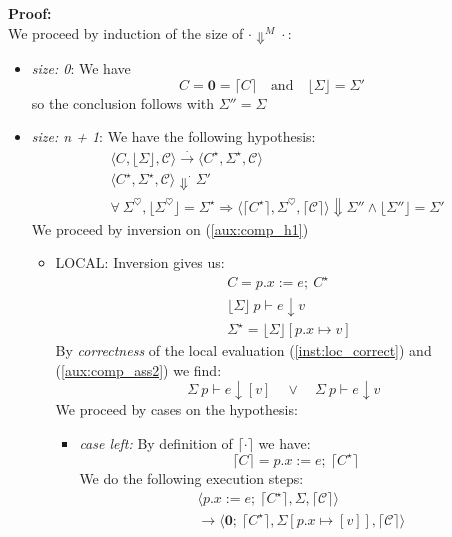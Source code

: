 \documentclass[12pt,a4paper,twoside]{book}
\newcommand{\heart}{\heartsuit}
\begin{document}
\noindent\textbf{Proof:}\\
We proceed by induction of the size of $\cdot \Downarrow^M \cdot$:
\begin{itemize}
\item \emph{size: 0}: We have 
$$ C = \boldsymbol{0} = \lceil C \rceil
\quad \text{and}\quad \lfloor \Sigma \rfloor = \Sigma'$$
so the conclusion follows with $\Sigma'' = \Sigma$
\item \emph{size: n + 1}: We have the following hypothesis:
\begin{align}
&\langle C, \lfloor \Sigma \rfloor, \mathscr{C}\rangle \xrightarrow{.}
\langle C^\star, \Sigma^\star, \mathscr{C}\rangle
\label{aux:comp_h1}\tag{H1}\\
&\langle C^\star, \Sigma^\star, \mathscr{C}\rangle
\Downarrow^\cdot \Sigma'
\label{aux:comp_h2}\tag{H2}\\
&\forall~\Sigma^\heart, \lfloor \Sigma^\heart \rfloor = \Sigma^\star
\Rightarrow \langle \lceil C^\star \rceil, \Sigma^\heart, \lceil \mathscr{C} \rceil\rangle \Downarrow \Sigma'' \land \lfloor \Sigma'' \rfloor = \Sigma'
\label{aux:comp_ih}\tag{IH}
\end{align}
We proceed by inversion on (\ref{aux:comp_h1})
\begin{itemize}
\item LOCAL: Inversion gives us:
\begin{align}
&C = p.x := e;~ C^\star \label{aux:comp_ass1}\tag{I1}\\
&\lfloor \Sigma \rfloor~p \vdash e \downarrow v \label{aux:comp_ass2}\tag{I2}\\
&\Sigma^\star = \lfloor \Sigma \rfloor[p.x \mapsto v]\label{aux:comp_ass3}\tag{I3}
\end{align}
By \emph{correctness} of the local evaluation (\ref{inst:loc_correct}) and (\ref{aux:comp_ass2}) we find:
\begin{equation}\label{aux:comp_ass4}
\Sigma~p \vdash e \downarrow [v] \quad \lor \quad
\Sigma~p \vdash e \downarrow v
\end{equation}
We proceed by cases on the hypothesis:
\begin{itemize}
\item \emph{case left:}
By definition of $\lceil \cdot \rceil$ we have:
$$\lceil C \rceil = p.x := e;~\lceil C^\star \rceil$$
We do the following execution steps:
\begin{align*}
&\langle p.x := e;~\lceil C^\star \rceil, \Sigma, \lceil \mathscr{C}\rceil\rangle\\
&\rightarrow\langle \boldsymbol{0};~\lceil C^\star \rceil, \Sigma[p.x \mapsto [v]], \lceil \mathscr{C} \rceil \rangle\\

\end{align*}
\end{itemize}
\end{itemize}
\end{itemize}
\end{document}
